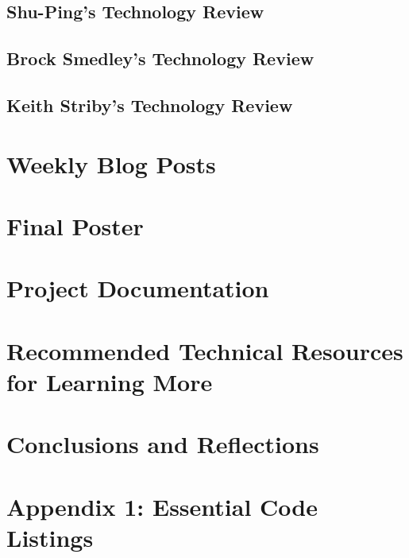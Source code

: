 \documentclass[letterpaper,10pt,serif,draftclsnofoot,onecolumn,compsoc,titlepage]{IEEEtran}
\begin{document}
\subsection{Shu-Ping's Technology Review}

%

\newpage

\subsection{Brock Smedley's Technology Review}

%

\newpage

\subsection{Keith Striby's Technology Review}



\section{Weekly Blog Posts}


\newpage

\section{Final Poster}


\newpage

\section{Project Documentation}


\newpage

\section{Recommended Technical Resources for Learning More}


\newpage

\section{Conclusions and Reflections}


\newpage

\section{Appendix 1: Essential Code Listings}


\nocite{*}
\newpage


\end{document}
